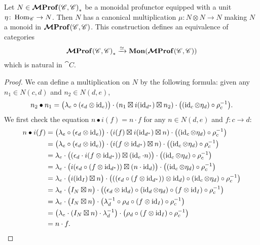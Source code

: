 \documentclass[12pt,oneside,article,draft]{memoir}
\begin{document}
\begin{proposition}\label{Prop:unit implies monoid}
	Let $N\in\bm{\mathcal{M}}\mathbf{Prof}{(\mathscr{C},\mathscr{C})}_*$ be a monoidal profunctor equipped with a unit $\eta\colon\operatorname{Hom}_{\mathscr{C}}\to N$.
	Then $N$ has a canonical multiplication $\mu\colon N\otimes N\to N$ making $N$ a monoid in $\bm{\mathcal{M}}\mathbf{Prof}(\mathscr{C},\mathscr{C})$.
	This construction defines an equivalence of categories
		\[\bm{\mathcal{M}}\mathbf{Prof}{(\mathscr{C},\mathscr{C})}_*\xrightarrow{\simeq}\mathbf{Mon}(\bm{\mathcal{M}}\mathbf{Prof}(\mathscr{C},\mathscr{C}))\]
	which is natural in $\cat{C}$.
\end{proposition}
\begin{proof}
	We can define a multiplication on $N$ by the following formula: given any $n_1\in N(c,d)$ and $n_2\in N(d,e)$,
	\[
		n_2\bullet n_1 = \bigl(\lambda_e\circ(\epsilon_d\otimes\operatorname{id}_e)\bigr)\cdot(n_1\boxtimes i(\operatorname{id}_{d^*})\boxtimes n_2)\cdot\bigl((\operatorname{id}_c\otimes \eta_d)\circ\rho_c^{-1}\bigr).
	\]
	We first check the equation $n\bullet i(f)=n\cdot f$ for any $n\in N(d,e)$ and $f\colon c\to d$:
	\begin{align*}
		n\bullet i(f) &= \bigl(\lambda_e\circ(\epsilon_d\otimes\operatorname{id}_e)\bigr)\cdot(i(f)\boxtimes i(\operatorname{id}_{d^*})\boxtimes n)\cdot\bigl((\operatorname{id}_c\otimes \eta_d)\circ\rho_c^{-1}\bigr) \\
		&= \bigl(\lambda_e\circ(\epsilon_d\otimes\operatorname{id}_e)\bigr)\cdot(i(f\otimes\operatorname{id}_{d^*})\boxtimes n)\cdot\bigl((\operatorname{id}_c\otimes \eta_d)\circ\rho_c^{-1}\bigr) \\
		&= \lambda_e\cdot\bigl((\epsilon_d\cdot i(f\otimes \operatorname{id}_{d^*}))\boxtimes (\operatorname{id}_e\cdot n)\bigr)\cdot\bigl((\operatorname{id}_c\otimes \eta_d)\circ\rho_c^{-1}\bigr) \\
		&= \lambda_e\cdot\bigl(i(\epsilon_d\circ (f\otimes \operatorname{id}_{d^*}))\boxtimes (n\cdot\operatorname{id}_d)\bigr)\cdot\bigl((\operatorname{id}_c\otimes \eta_d)\circ\rho_c^{-1}\bigr) \\
		&= \lambda_e\cdot\bigl(i(\operatorname{id}_I)\boxtimes n\bigr)\cdot\bigl(((\epsilon_d\circ (f\otimes \operatorname{id}_{d^*}))\otimes\operatorname{id}_d)\circ(\operatorname{id}_c\otimes \eta_d)\circ\rho_c^{-1}\bigr) \\
		&= \lambda_e\cdot\bigl(I_N\boxtimes n\bigr)\cdot\bigl((\epsilon_d\otimes\operatorname{id}_d)\circ(\operatorname{id}_d\otimes\eta_d)\circ(f\otimes\operatorname{id}_I)\circ\rho_c^{-1}\bigr) \\
		&= \lambda_e\cdot\bigl(I_N\boxtimes n\bigr)\cdot\bigl(\lambda_d^{-1}\circ\rho_d\circ(f\otimes\operatorname{id}_I)\circ\rho_c^{-1}\bigr) \\
		&= \bigl(\lambda_e\cdot(I_N\boxtimes n)\cdot\lambda_d^{-1}\bigr)\cdot\bigl(\rho_d\circ(f\otimes\operatorname{id}_I)\circ\rho_c^{-1}\bigr) \\
		&= n\cdot f.
	\end{align*}


\end{proof}
\end{document}
